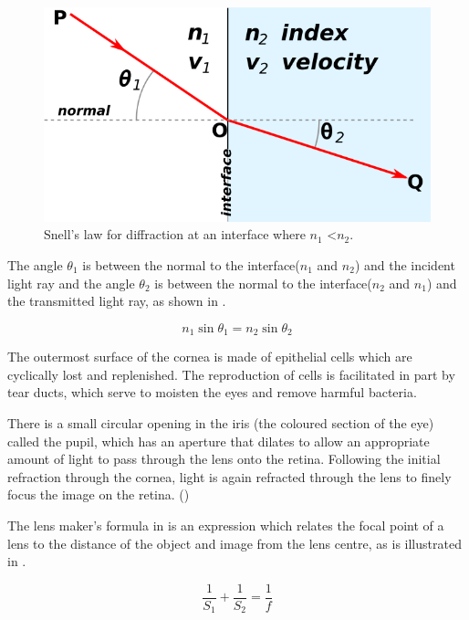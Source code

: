 \begin{figure}[htbp]
 \centering
   \includegraphics{figures/snells}
 \caption{Snell's law for diffraction at an interface where $n_1$ \textless $n_2$.\cite{wikisnell}}
 \label{fig:snell}
\end{figure}

The angle $\theta_1$ is between the normal to the interface($n_1$ and $n_2$)
and the incident light ray and the angle $\theta_2$ is between the normal to
the interface($n_2$ and $n_1$) and the transmitted light ray, as shown in .

\begin{equation}
n_1\sin\theta_1=n_2\sin\theta_2
\label{eq:refractive}
\end{equation}

The outermost surface of the cornea is made of epithelial cells which
are cyclically lost and replenished.
\cite{jester1999cellular,hassell2010molecular} The reproduction
of cells is facilitated in part by tear ducts, which serve to
moisten the eyes and remove harmful bacteria.\cite{holly1977tear}


There is a small circular opening in the iris (the coloured section of
the eye) called the pupil, which has an aperture that dilates to allow
an appropriate amount of light to pass through the lens onto the retina.
Following the initial refraction through the cornea, light is again refracted
through the lens to finely focus the image on the retina. ()

The lens maker’s formula in  is an expression which relates the
focal point of a lens to the distance of the object and image from the lens centre,
as is illustrated in .


\begin{equation}
\frac{1}{S_1} + \frac{1}{S_2} = \frac{1}{f}
\label{eq:lens_makers}
\end{equation}

